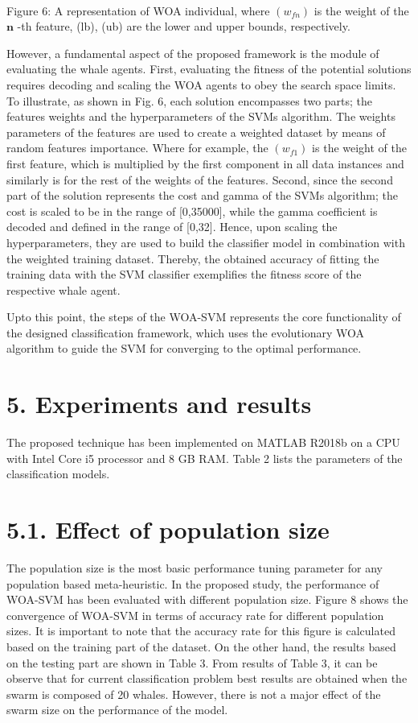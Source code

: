 \documentclass{article}
\begin{document}
\\
Figure 6: A representation of WOA individual, where $(w_{f n})$ is the weight of the $\mathbf{n}$ -th feature, (lb), (ub) are the lower and upper bounds, respectively.


However, a fundamental aspect of the proposed framework is the module of evaluating the whale agents. First, evaluating the fitness of the potential solutions requires decoding and scaling the WOA agents to obey the search space limits. To illustrate, as shown in Fig. 6, each solution encompasses two parts; the features weights and the hyperparameters of the SVMs algorithm. The weights parameters of the features are used to create a weighted dataset by means of random features importance. Where for example, the $(w_{f1})$ is the weight of the first feature, which is multiplied by the first component in all data instances and similarly is for the rest of the weights of the features. Second, since the second part of the solution represents the cost and gamma of the SVMs algorithm; the cost is scaled to be in the range of [0,35000], while the gamma coefficient is decoded and defined in the range of [0,32]. Hence, upon scaling the hyperparameters, they are used to build the classifier model in combination with the weighted training dataset. Thereby, the obtained accuracy of fitting the training data with the SVM classifier exemplifies the fitness score of the respective whale agent.


Upto this point, the steps of the WOA-SVM represents the core functionality of the designed classification framework, which uses the evolutionary WOA algorithm to guide the SVM for converging to the optimal performance.


\section{5. Experiments and results}

The proposed technique has been implemented on MATLAB R2018b on a CPU with Intel Core i5 processor and 8 GB RAM. Table 2 lists the parameters of the classification models.


\section{5.1. Effect of population size}

The population size is the most basic performance tuning parameter for any population based meta-heuristic. In the proposed study, the performance of WOA-SVM has been evaluated with different population size. Figure 8 shows the convergence of WOA-SVM in terms of accuracy rate for different population sizes. It is important to note that the accuracy rate for this figure is calculated based on the training part of the dataset. On the other hand, the results based on the testing part are shown in Table 3. From results of Table 3, it can be observe that for current classification problem best results are obtained when the swarm is composed of 20 whales. However, there is not a major effect of the swarm size on the performance of the model.
\end{document}
